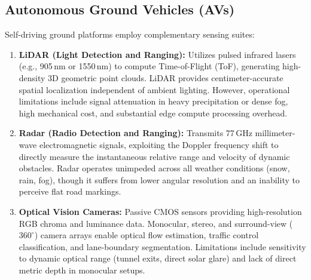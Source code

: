 \documentclass[conference,10pt]{IEEEtran}
\begin{document}
\subsection{Autonomous Ground Vehicles (AVs)}
Self-driving ground platforms employ complementary sensing suites:
\begin{enumerate}
    \item \textbf{LiDAR (Light Detection and Ranging):} Utilizes pulsed infrared lasers (e.g., 905\,nm or 1550\,nm) to compute Time-of-Flight (ToF), generating high-density 3D geometric point clouds. LiDAR provides centimeter-accurate spatial localization independent of ambient lighting. However, operational limitations include signal attenuation in heavy precipitation or dense fog, high mechanical cost, and substantial edge compute processing overhead.
    \item \textbf{Radar (Radio Detection and Ranging):} Transmits 77\,GHz millimeter-wave electromagnetic signals, exploiting the Doppler frequency shift to directly measure the instantaneous relative range and velocity of dynamic obstacles. Radar operates unimpeded across all weather conditions (snow, rain, fog), though it suffers from lower angular resolution and an inability to perceive flat road markings.
    \item \textbf{Optical Vision Cameras:} Passive CMOS sensors providing high-resolution RGB chroma and luminance data. Monocular, stereo, and surround-view ($360^\circ$) camera arrays enable optical flow estimation, traffic control classification, and lane-boundary segmentation. Limitations include sensitivity to dynamic optical range (tunnel exits, direct solar glare) and lack of direct metric depth in monocular setups.
\end{enumerate}
\end{document}
